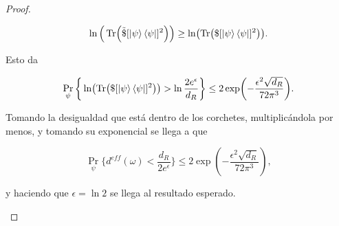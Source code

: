 \begin{proof}
\begin{enumerate}
\begin{equation}
\ln\Big( \Tr (\tilde{\$}[\ket{\psi}\bra{\psi}]^{2}) \Big) \geq \ln ( \Tr ( \$ [\ket{\psi}\bra{\psi}]^{2}) ).
\end{equation}

Esto da 

\begin{equation}
\Pr_{\psi}  \bigg \{ \ln (\Tr ( \$ [\ket{\psi}\bra{\psi}]^{2})) > \ln\frac{2e^{\epsilon}}{d_{R}} \bigg \} \leq 2 \exp (-\frac{\epsilon^{2} \sqrt{d_{R}}}{72 \pi^{3}}).
\end{equation}

Tomando la desigualdad que está dentro de los corchetes, multiplicándola por menos, y tomando su exponencial se llega a que

\begin{equation}
\Pr_{\psi} \bigg \{  d^{eff}(\omega) < \frac{d_{R}}{2e^{\epsilon}} \bigg \} \leq 2\exp(-\frac{\epsilon^{2}\sqrt{d_{R}}}{72\pi^{3}}),
\end{equation}

y haciendo que $\epsilon=\ln 2$ se llega al resultado esperado.
\\
\end{enumerate}
\end{proof}

